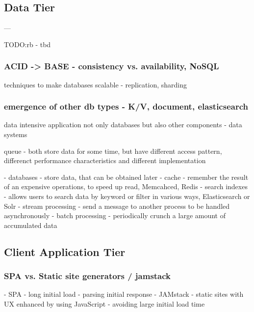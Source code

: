 \subsection*{Data Tier}

---

TODO:rb - tbd


\subsubsection*{ACID -> BASE - consistency vs. availability, NoSQL}

techniques to make databases scalable - replication, sharding

\subsubsection*{emergence of other db types - K/V, document, elasticsearch}


data intensive application
not only databases but also other components - data systems

queue - both store data for some time, but have different access pattern, differenct performance characteristics and different implementation

- databases - store data, that can be obtained later
- cache - remember the result of an expensive operations, to speed up read, Memcahced, Redis
- search indexes - allows users to search data by keyword or filter in various ways, Elasticsearch or Solr
- stream processing - send a message to another process to be handled asynchronously
- batch processing - periodically crunch a large amount of accumulated data

\subsection*{Client Application Tier}

\subsubsection*{SPA vs. Static site generators / jamstack}

- SPA - long initial load - parsing initial response
- JAMstack - static sites with UX enhanced by using JavaScript - avoiding large initial load time

